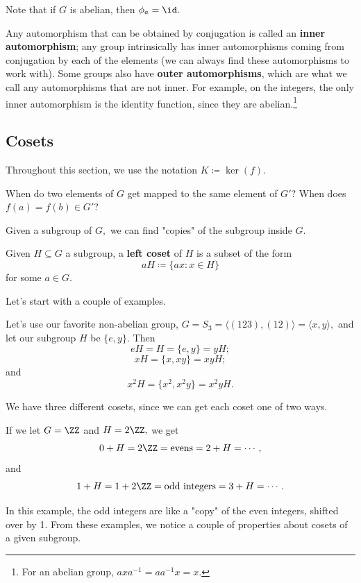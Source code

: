 Note that if $G$ is abelian, then $\phi_a = \id.$

Any automorphism that can be obtained by conjugation is called an \textbf{inner automorphism}; any group intrinsically has inner automorphisms coming from conjugation by each of the elements (we can always find these automorphisms to work with). Some groups also have \textbf{outer automorphisms}, which are what we call any automorphisms that are not inner. For example, on the integers, the only inner automorphism is the identity function, since they are abelian.\footnote{For an abelian group, $axa^{-1} = aa^{-1}x = x$.}

\subsection{Cosets}

Throughout this section, we use the notation $K \coloneqq \ker(f)$.

\begin{qq}
When do two elements of $G$ get mapped to the same element of $G'$? When does $f(a) = f(b) \in G'$?

\end{qq}

Given a subgroup of $G,$ we can find "copies" of the subgroup inside $G.$
\begin{definition}
Given $H \subseteq G$ a subgroup, a \textbf{left coset} of $H$ is a subset of the form \[aH \coloneqq \{ax : x \in H\}\] for some $a \in G$.
\end{definition}

Let's start with a couple of examples. 

\begin{example}[Cosets in $S_3$]
Let's use our favorite non-abelian group, $G = S_3 = \langle (123), (12) \rangle = \langle x, y \rangle,$ and let our subgroup $H$ be $\{e, y\}.$ Then 
\[
eH = H = \{e, y\} = yH;
\]
\[
xH = \{x, xy\} = xyH;
\]
and
\[
x^2H = \{x^2, x^2y\} = x^2yH.
\]

We have three different cosets, since we can get each coset one of two ways.
\end{example}

\begin{example}
If we let $G = \ZZ$ and $H = 2\ZZ,$ we get 
\[
0 + H = 2\ZZ = \text{evens} = 2 + H = \cdots,
\]
and 
\[
1 + H = 1 + 2\ZZ = \text{odd integers} = 3 + H = \cdots .
\]
\end{example}

In this example, the odd integers are like a "copy" of the even integers, shifted over by 1. From these examples, we notice a couple of properties about cosets of a given subgroup.

